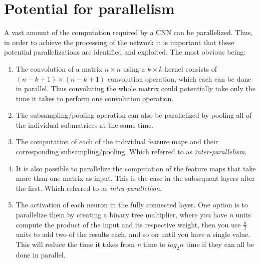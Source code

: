 \section{Potential for parallelism} \label{sec_pot_parallelism} 

A vast amount of the computation required by a CNN can be parallelized. Thus, in order to achieve the processing of the network it is important that these potential parallelizations are identified and exploited. The most obvious being:

\begin{enumerate}
    
    \item The convolution of a matrix $ n \times n $ using a $ k \times k $ kernel consists of $ (n - k + 1) \times (n - k + 1) $ convolution operation, which each can be done in parallel. Thus convoluting the whole matrix could potentially take only the time it takes to perform one convolution operation. 
    
    \item The subsampling/pooling operation can also be parallelized by pooling all of the individual submatrices at the same time.  
	
    \item The computation of each of the individual feature maps and their corresponding subsampling/pooling. Which \cite{Chakradhar2010} referred to as \textit{inter-parallelism}.
	
    \item It is also possible to parallelize the computation of the feature maps that take more than one matrix as input. This is the case in the subsequent layers after the first. Which \cite{Chakradhar2010} referred to as \textit{intra-parallelism}.
	
    \item The activation of each neuron in the fully connected layer. One option is to parallelize them by creating a binary tree multiplier, where you have \textit{n} units compute the product of the input and its respective weight, then you use $ \frac{n}{2} $ units to add two of the results each, and so on until you have a single value. This will reduce the time it takes from \textit{n} time to $ log_2 n $ time if they can all be done in parallel.   
\end{enumerate}
